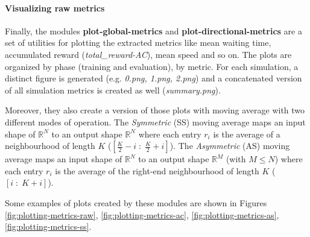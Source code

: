 \putimagecouple
{}
{}

\paragraph{Visualizing raw metrics}

Finally, the modules \textbf{plot-global-metrics} and \textbf{plot-directional-metrics} are a set of utilities for plotting the extracted metrics like mean waiting time, accumulated reward (\textit{total\_reward-AC}), mean speed and so on.
The plots are organized by phase (training and evaluation), by metric. For each simulation, a distinct figure is generated (e.g. \textit{0.png, 1.png, 2.png}) and a concatenated version of all simulation metrics is created as well (\textit{summary.png}).

Moreover, they also create a version of those plots with moving average with two different modes of operation.
The \textit{Symmetric} (SS) moving average maps an input shape of $\mathbb{R}^N$ to an output shape $\mathbb{R}^N$ where each entry $r_i$ is the average of a neighbourhood of length $K$ ($[\frac K 2 - i \; : \; \frac K 2 + i]$).
The \textit{Asymmetric} (AS) moving average maps an input shape of $\mathbb{R}^N$ to an output shape $\mathbb{R}^M$ (with $M \leq N$) where each entry $r_i$ is the average of the right-end neighbourhood of length $K$ ($[i \; : \; K + i]$).

Some examples of plots created by these modules are shown in Figures \ref{fig:plotting-metrics-raw}, \ref{fig:plotting-metrics-ac}, \ref{fig:plotting-metrics-as}, \ref{fig:plotting-metrics-ss}.


